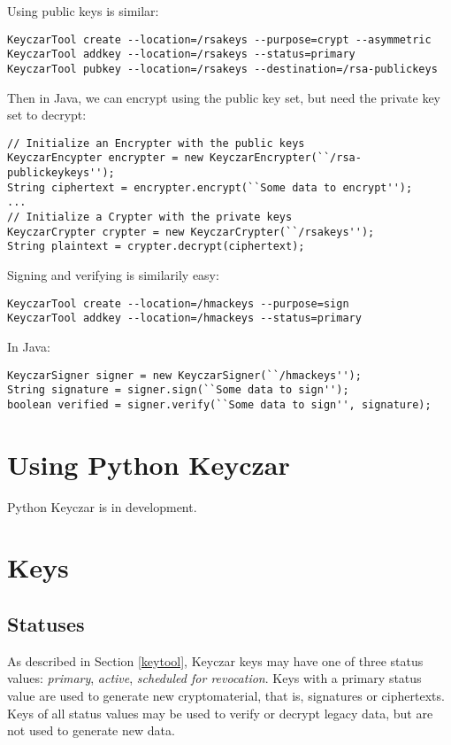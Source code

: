 \documentclass{llncs}
\begin{document}
Using public keys is similar:
\begin{verbatim}
KeyczarTool create --location=/rsakeys --purpose=crypt --asymmetric
KeyczarTool addkey --location=/rsakeys --status=primary
KeyczarTool pubkey --location=/rsakeys --destination=/rsa-publickeys
\end{verbatim}

Then in Java, we can encrypt using the public key set, but need the private key
set to decrypt:
\begin{verbatim}
// Initialize an Encrypter with the public keys
KeyczarEncypter encrypter = new KeyczarEncrypter(``/rsa-publickeykeys'');
String ciphertext = encrypter.encrypt(``Some data to encrypt'');
... 
// Initialize a Crypter with the private keys
KeyczarCrypter crypter = new KeyczarCrypter(``/rsakeys'');
String plaintext = crypter.decrypt(ciphertext);
\end{verbatim}



Signing and verifying is similarily easy:
\begin{verbatim}
KeyczarTool create --location=/hmackeys --purpose=sign
KeyczarTool addkey --location=/hmackeys --status=primary
\end{verbatim}

In Java:
\begin{verbatim}
KeyczarSigner signer = new KeyczarSigner(``/hmackeys'');
String signature = signer.sign(``Some data to sign'');
boolean verified = signer.verify(``Some data to sign'', signature);
\end{verbatim}


\section{Using Python Keyczar}

Python Keyczar is in development.

\section{Keys}

\subsection{Statuses}\label{status}

As described in Section \ref{keytool}, Keyczar keys may have one of three
status values: {\it primary}, {\it active}, {\it scheduled for revocation}.
Keys with a primary status value are used to generate new cryptomaterial, that
is, signatures or ciphertexts. Keys of all status values may be used to verify
or decrypt legacy data, but are not used to generate new data.
\end{document}
